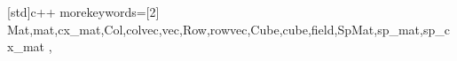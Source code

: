[std]{c++}
{
    morekeywords=[2]{
        Mat,mat,cx_mat,Col,colvec,vec,Row,rowvec,Cube,cube,field,SpMat,sp_mat,sp_cx_mat
    },
}

